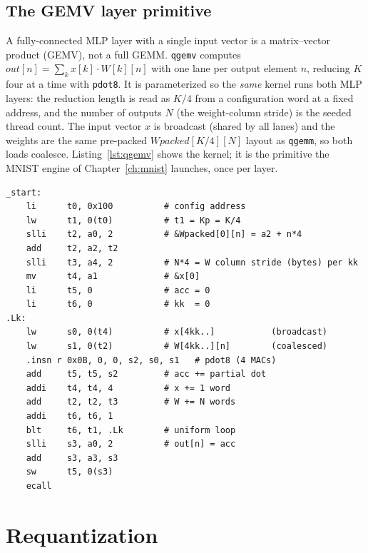 \documentclass[12pt,a4paper,oneside]{report}
\newcommand{\code}[1]{\texttt{#1}}
\begin{document}
\section{The GEMV layer primitive}
A fully-connected MLP layer with a single input vector is a matrix--vector product
(GEMV), not a full GEMM. \code{qgemv} computes $\mathit{out}[n]=\sum_{k}x[k]\cdot
W[k][n]$ with one lane per output element $n$, reducing $K$ four at a time with
\code{pdot8}. It is parameterized so the \emph{same} kernel runs both MLP layers:
the reduction length is read as $K/4$ from a configuration word at a fixed address,
and the number of outputs $N$ (the weight-column stride) is the seeded thread
count. The input vector $x$ is broadcast (shared by all lanes) and the weights are
the same pre-packed $\mathit{Wpacked}[K/4][N]$ layout as \code{qgemm}, so both
loads coalesce. Listing~\ref{lst:qgemv} shows the kernel; it is the primitive the
MNIST engine of Chapter~\ref{ch:mnist} launches, once per layer.

\begin{lstlisting}[caption={The parameterized INT8 GEMV kernel. \code{Kp} is read
from a config word; \code{N} is the seeded thread count \code{a4}. The K-loop is
uniform, so it never diverges.},label={lst:qgemv}]
_start:
    li      t0, 0x100          # config address
    lw      t1, 0(t0)          # t1 = Kp = K/4
    slli    t2, a0, 2          # &Wpacked[0][n] = a2 + n*4
    add     t2, a2, t2
    slli    t3, a4, 2          # N*4 = W column stride (bytes) per kk
    mv      t4, a1             # &x[0]
    li      t5, 0              # acc = 0
    li      t6, 0              # kk  = 0
.Lk:
    lw      s0, 0(t4)          # x[4kk..]           (broadcast)
    lw      s1, 0(t2)          # W[4kk..][n]        (coalesced)
    .insn r 0x0B, 0, 0, s2, s0, s1   # pdot8 (4 MACs)
    add     t5, t5, s2         # acc += partial dot
    addi    t4, t4, 4          # x += 1 word
    add     t2, t2, t3         # W += N words
    addi    t6, t6, 1
    blt     t6, t1, .Lk        # uniform loop
    slli    s3, a0, 2          # out[n] = acc
    add     s3, a3, s3
    sw      t5, 0(s3)
    ecall
\end{lstlisting}

\chapter{Requantization}
\label{ch:requant}
\end{document}
